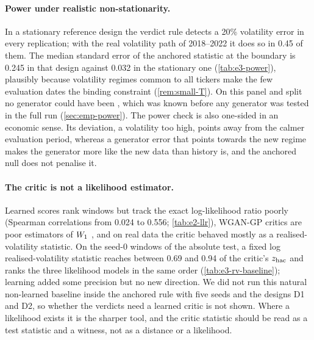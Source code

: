 \paragraph{Power under realistic non-stationarity.}
In a stationary reference design the verdict rule detects a 20\% volatility error in every
replication; with the real volatility path of 2018--2022 it does so in 0.45 of them. The median
standard error of the anchored statistic at the boundary is 0.245 in that design against 0.032 in
the stationary one (\cref{tab:e3-power}), plausibly because volatility regimes common to all
tickers make the few evaluation dates the binding constraint (\cref{rem:small-T}). On this panel
and split no generator could have been \GOOD, which was known before any generator was tested in
the full run (\cref{sec:emp-power}). The power check is also one-sided in an economic sense.
Its deviation, a volatility too high, points away from the calmer evaluation period, whereas a generator error
that points towards the new regime makes the generator more like the new data than history is,
and the anchored null does not penalise it.

\paragraph{The critic is not a likelihood estimator.}
Learned scores rank windows but track the exact log-likelihood ratio poorly (Spearman
correlations from 0.024 to 0.556; \cref{tab:e2-llr}), WGAN-GP critics are poor estimators of
$W_{1}$ \citep{mallasto2019well}, and on real data the critic behaved mostly as a realised-volatility
statistic. On the seed-0 windows of the absolute test, a fixed log realised-volatility statistic
reaches between 0.69 and 0.94 of the critic's $z_{\mathrm{hac}}$ and ranks the three likelihood models in the
same order (\cref{tab:e3-rv-baseline}); learning added some precision but no new direction. We did
not run this natural non-learned baseline inside the anchored rule with five seeds and the designs
D1 and D2, so whether the verdicts need a learned critic is not shown.
Where a likelihood exists it is the sharper tool, and the critic statistic should be read as a
test statistic and a witness, not as a distance or a likelihood.

